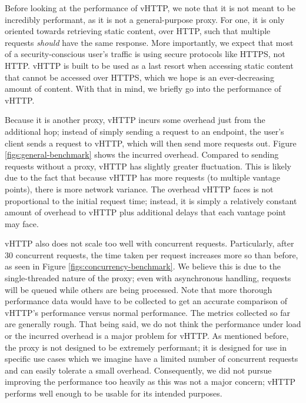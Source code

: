 Before looking at the performance of vHTTP, we note that it is not meant to be
incredibly performant, as it is not a general-purpose proxy. For one, it is
only oriented towards retrieving static content, over HTTP, such that multiple
requests \emph{should} have the same response. More importantly, we expect that
most of a security-conscious user's traffic is using secure protocols like
HTTPS, not HTTP. vHTTP is built to be used as a last resort when accessing
static content that cannot be accessed over HTTPS, which we hope is an
ever-decreasing amount of content. With that in mind, we briefly go into the
performance of vHTTP.

Because it is another proxy, vHTTP incurs some overhead just from the
additional hop; instead of simply sending a request to an endpoint, the user's
client sends a request to vHTTP, which will then send more requests out.
Figure \ref{figs:general-benchmark} shows the incurred overhead. Compared to
sending requests without a proxy, vHTTP has slightly greater fluctuation. This
is likely due to the fact that because vHTTP has more requests (to multiple
vantage points), there is more network variance. The overhead vHTTP faces is
not proportional to the initial request time; instead, it is simply a
relatively constant amount of overhead to vHTTP plus additional delays that
each vantage point may face.

vHTTP also does not scale too well with concurrent requests. Particularly,
after 30 concurrent requests, the time taken per request increases more so
than before, as seen in Figure \ref{figs:concurrency-benchmark}. We believe
this is due to the single-threaded nature of the proxy; even with asynchronous
handling, requests will be queued while others are being processed. Note that
more thorough performance data would have to be collected to get an accurate
comparison of vHTTP's performance versus normal performance. The metrics
collected so far are generally rough. That being said, we do not think the
performance under load or the incurred overhead is a major problem for
vHTTP. As mentioned before, the proxy is not designed to be extremely
performant; it is designed for use in specific use cases which we imagine have
a limited number of concurrent requests and can easily tolerate a small
overhead. Consequently, we did not pursue improving the performance too heavily
as this was not a major concern; vHTTP performs well enough to be usable for
its intended purposes.



